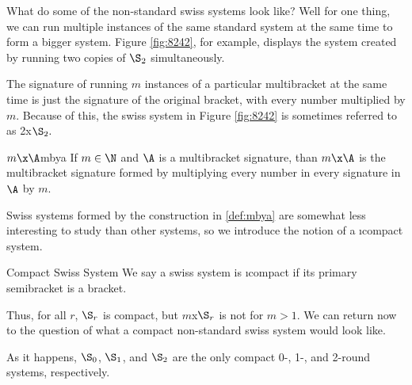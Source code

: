 {    What do some of the non-standard swiss systems look like? Well for one thing, we can run multiple instances of the same standard system at the same time to form a bigger system. Figure \ref{fig:8242}, for example, displays the system created by running two copies of $\S_2$ simultaneously.


    The signature of running $m$ instances of a particular multibracket at the same time is just the signature of the original bracket, with every number multiplied by $m$. Because of this, the swiss system in Figure \ref{fig:8242} is sometimes referred to as 2x$\S_2.$

    \begin{definition}{$m\x\A$}{mbya}
        If $m \in \N$ and $\A$ is a multibracket signature, than $m\x\A$ is the multibracket signature formed by multiplying every number in every signature in $\A$ by $m$.
    \end{definition}

    Swiss systems formed by the construction in \ref{def:mbya} are somewhat less interesting to study than other systems, so we introduce the notion of a \i{compact} system.

    \begin{definition}{Compact Swiss System}{}
        We say a swiss system is \i{compact} if its primary semibracket is a bracket.
    \end{definition}

    Thus, for all $r$, $\S_r$ is compact, but $m$x$\S_r$ is not for $m > 1.$ We can return now to the question of what a compact non-standard swiss system would look like.

    As it happens, $\S_0$, $\S_1$, and $\S_2$ are the only compact 0-, 1-, and 2-round systems, respectively.


}
